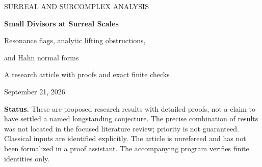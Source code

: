 \documentclass[11pt,letterpaper]{article}
\theoremstyle{definition}
\theoremstyle{remark}
\newcommand{\No}{\mathbf{No}}
\numberwithin{equation}{section}
\begin{document}
\begin{titlepage}
\centering
\vspace*{1.0cm}
{\large SURREAL AND SURCOMPLEX ANALYSIS\par}
\vspace{1.1cm}
{\LARGE\bfseries Small Divisors at Surreal Scales\par}
\vspace{0.6cm}
{\Large Resonance flags, analytic lifting obstructions,\par
and Hahn normal forms\par}
\vspace{1cm}
{\large A research article with proofs and exact finite checks\par}
\vspace{0.5cm}
{September 21, 2026\par}
\vspace{1cm}
\begin{minipage}{0.89\textwidth}
\begin{abstract}
A surreal frequency can contain a transfinite hierarchy of scales, while a
cohomological equation on a torus has infinitely many Fourier divisors.
We show that a frequency vector in $\No^d$ nevertheless has at most $d$
nonzero divisor-valuation levels.  A canonical descending flag of integer
resonance lattices identifies these levels and gives a single well-ordered
support containing every reciprocal divisor.

For holomorphic coefficients on one fixed complex strip, a stratified
subexponential small-divisor condition is then necessary and sufficient for
universal Hahn-analytic solvability.  Under the same condition, a vector field
perturbed beyond its last resonance scale has a unique infinitesimal,
mean-zero conjugacy to a constant vector field with a frequency correction.
The proof uses finite word representations in positive Hahn supports, not an
invalid appeal to sequential convergence.  Conversely, failure of the
arithmetic condition produces non-linearizable perturbations beyond any
prescribed valuation threshold.

We also construct entire forcing terms for which any prescribed finite
number of analytic lifting steps succeeds, but the next forced coefficient
is not even a distribution.  A boundary example makes the perturbation-scale
threshold sharp as a uniform statement.  An invariant-density theorem and
explicit examples at scales $1,t,t^\omega$ complete the development.
\end{abstract}
\end{minipage}
\vfill
\begin{minipage}{0.89\textwidth}
\small
\textbf{Status.} These are proposed research results with detailed proofs,
not a claim to have settled a named longstanding conjecture.  The precise
combination of results was not located in the focused literature review;
priority is not guaranteed.  Classical inputs are identified explicitly.
The article is unrefereed and has not been formalized in a proof assistant.
The accompanying program verifies finite identities only.
\end{minipage}
\end{titlepage}
\end{document}
